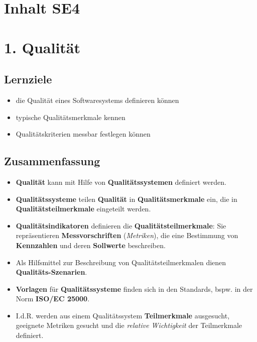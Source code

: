 \section{Inhalt SE4}

\section*{1. Qualität}

\subsection*{Lernziele}

\begin{itemize}
    \item die Qualität eines Softwaresystems definieren können
    \item typische Qualitätsmerkmale kennen
    \item Qualitätskriterien messbar festlegen können
\end{itemize}

\subsection*{Zusammenfassung}

\begin{itemize}
    \item \textbf{Qualität} kann mit Hilfe von \textbf{Qualitätssystemen} definiert werden.
    \item \textbf{Qualitätssysteme} teilen \textbf{Qualität} in \textbf{Qualitätsmerkmale} ein, die in \textbf{Qualitätsteilmerkmale} eingeteilt werden.
    \item \textbf{Qualitätsindikatoren} definieren die \textbf{Qualitätsteilmerkmale}: Sie repräsentieren \textbf{Messvorschriften} (\textit{Metriken}), die eine Bestimmung von \textbf{Kennzahlen} und deren \textbf{Sollwerte} beschreiben.
    \item Als Hilfsmittel zur Beschreibung von Qualitätsteilmerkmalen dienen \textbf{Qualitäts-Szenarien}.
    \item \textbf{Vorlagen} für \textbf{Qualitätssysteme} finden sich in den Standards, bspw. in der Norm \textbf{ISO/EC 25000}.
    \item I.d.R. werden aus einem Qualitätssystem \textbf{Teilmerkmale} ausgesucht, geeignete Metriken gesucht und die \textit{relative Wichtigkeit} der Teilmerkmale definiert.
\end{itemize}


